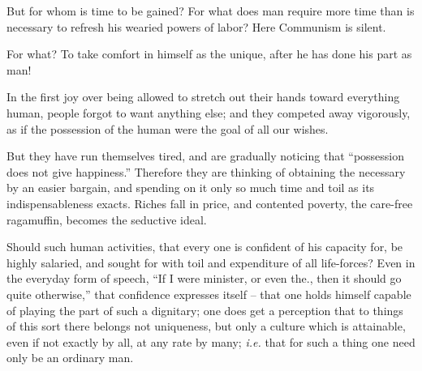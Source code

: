 \documentclass[12pt,a4paper]{book}
\begin{document}
But for whom is time to be gained? For what does man require more time than is 
necessary to refresh his wearied powers of labor? Here Communism is silent.

For what? To take comfort in himself as the unique, after he has done his part 
as man!

In the first joy over being allowed to stretch out their hands toward 
everything human, people forgot to want anything else; and they competed away 
vigorously, as if the possession of the human were the goal of all our wishes.

But they have run themselves tired, and are gradually noticing that 
``possession does not give happiness.'' Therefore they are thinking of 
obtaining the necessary by an easier bargain, and spending on it only so much 
time and toil as its indispensableness exacts. Riches fall in price, and 
contented poverty, the care-free ragamuffin, becomes the seductive ideal.

Should such human activities, that every one is confident of his capacity for, 
be highly salaried, and sought for with toil and expenditure of all 
life-forces? Even in the everyday form of speech, ``If I were minister, or 
even the., then it should go quite otherwise,'' that confidence expresses 
itself -- that one holds himself capable of playing the part of such a 
dignitary; one does get a perception that to things of this sort there belongs 
not uniqueness, but only a culture which is attainable, even if not exactly by 
all, at any rate by many; \textit{i.e.} that for such a thing one need only be 
an ordinary man.
\end{document}
